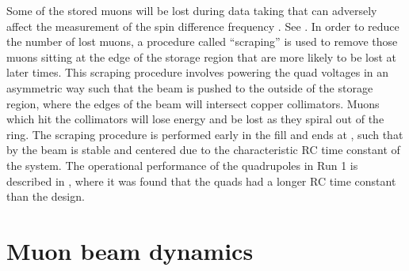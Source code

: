 Some of the stored muons will be lost during data taking that can adversely affect the measurement of the spin difference frequency \wa. See . In order to reduce the number of lost muons, a procedure called ``scraping'' is used to remove those muons sitting at the edge of the storage region that are more likely to be lost at later times. This scraping procedure involves powering the quad voltages in an asymmetric way such that the beam is pushed to the outside of the storage region, where the edges of the beam will intersect copper collimators. Muons which hit the collimators will lose energy and be lost as they spiral out of the ring. The scraping procedure is performed early in the fill and ends at , such that by  the beam is stable and centered due to the characteristic RC time constant of the system. The operational performance of the quadrupoles in Run 1 is described in , where it was found that the quads had a longer RC time constant than the design.



\section{Muon beam dynamics}
\label{sec:muonbeamdynamics}

